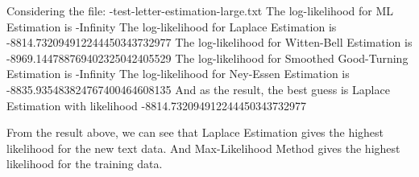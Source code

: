 \documentclass[preprint,12pt]{elsarticle}
\begin{document}
\begin{enumerate}
\begin{spverbatim}
Considering the file:  -test-letter-estimation-large.txt
The log-likelihood for  ML Estimation  is  
-Infinity
The log-likelihood for  Laplace Estimation  is  
-8814.732094912244450343732977
The log-likelihood for  Witten-Bell Estimation  is  
-8969.144788769402325042405529
The log-likelihood for  Smoothed Good-Turning Estimation  is  
-Infinity
The log-likelihood for  Ney-Essen Estimation  is  
-8835.935483824767400464608135
And as the result, the best guess is  Laplace Estimation  with likelihood  
-8814.732094912244450343732977 
    \end{spverbatim}
    From the result above, we can see that Laplace Estimation gives
    the highest likelihood for the new text data. And Max-Likelihood 
    Method gives the highest likelihood for the training data.
    \end{enumerate}
\end{document}
